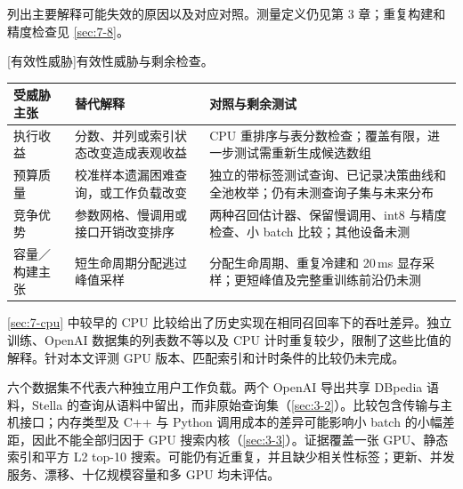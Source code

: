  列出主要解释可能失效的原因以及对应对照。测量定义仍见第 3 章；重复构建和精度检查见 \cref{sec:7-8}。

\par\medskip\noindent\begin{minipage}{\linewidth}
\centering\captionsetup{hypcap=false}
[有效性威胁]{有效性威胁与剩余检查。}
\label{tab:8-threats}
\footnotesize\setlength{\tabcolsep}{4pt}
\begin{tabularx}{\linewidth}{@{}*{3}{>{\raggedright\arraybackslash}X}@{}}
\toprule
受威胁主张 & 替代解释 & 对照与剩余测试 \\
\midrule
执行收益 & 分数、并列或索引状态改变造成表观收益 & CPU 重排序与表分数检查；覆盖有限，进一步测试需重新生成候选数组 \\
预算质量 & 校准样本遗漏困难查询，或工作负载改变 & 独立的带标签测试查询、已记录决策曲线和全池枚举；仍有未测查询子集与未来分布 \\
竞争优势 & 参数网格、慢调用或接口开销改变排序 & 两种召回估计器、保留慢调用、int8 与精度检查、小 batch 比较；其他设备未测 \\
容量／构建主张 & 短生命周期分配逃过峰值采样 & 分配生命周期、重复冷建和 20\,ms 显存采样；更短峰值及完整重训练前沿仍未测 \\
\bottomrule
\end{tabularx}
\end{minipage}\par\medskip

\cref{sec:7-cpu} 中较早的 CPU 比较给出了历史实现在相同召回率下的吞吐差异。独立训练、OpenAI 数据集的列表数不等以及 CPU 计时重复较少，限制了这些比值的解释。针对本文评测 GPU 版本、匹配索引和计时条件的比较仍未完成。

六个数据集不代表六种独立用户工作负载。两个 OpenAI 导出共享 DBpedia 语料，Stella 的查询从语料中留出，而非原始查询集（\cref{sec:3-2}）。比较包含传输与主机接口；内存类型及 C++ 与 Python 调用成本的差异可能影响小 batch 的小幅差距，因此不能全部归因于 GPU 搜索内核（\cref{sec:3-3}）。证据覆盖一张 GPU、静态索引和平方 L2 top-10 搜索。可能仍有近重复，并且缺少相关性标签；更新、并发服务、漂移、十亿规模容量和多 GPU 均未评估。
